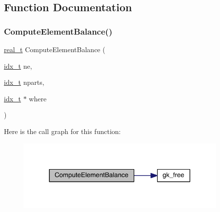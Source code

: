 \subsection{Function Documentation}
\mbox{\label{a00963_a98c28fb34f447f219799acdb79c3bff9}} 
\subsubsection{\texorpdfstring{Compute\+Element\+Balance()}{ComputeElementBalance()}}
{\footnotesize\ttfamily \hyperlink{a00876_a1924a4f6907cc3833213aba1f07fcbe9}{real\+\_\+t} Compute\+Element\+Balance (\begin{DoxyParamCaption}\item[{\hyperlink{a00876_aaa5262be3e700770163401acb0150f52}{idx\+\_\+t}}]{ne,  }\item[{\hyperlink{a00876_aaa5262be3e700770163401acb0150f52}{idx\+\_\+t}}]{nparts,  }\item[{\hyperlink{a00876_aaa5262be3e700770163401acb0150f52}{idx\+\_\+t} $\ast$}]{where }\end{DoxyParamCaption})}

Here is the call graph for this function\+:\nopagebreak
\begin{figure}[H]
\begin{center}
\leavevmode
\includegraphics[width=296pt]{a00963_a98c28fb34f447f219799acdb79c3bff9_cgraph}
\end{center}
\end{figure}
\mbox{\label{a00963_aaae826710f48d49c2961c5507760e6f0}} 

